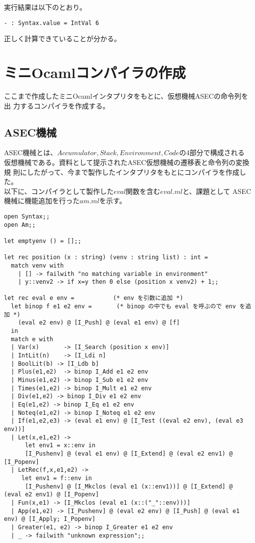 \documentclass[a4paper,9pt]{jsarticle}
\begin{document}
実行結果は以下のとおり。

\begin{lstlisting}
- : Syntax.value = IntVal 6
\end{lstlisting}

正しく計算できていることが分かる。

\section{ミニOcamlコンパイラの作成}
ここまで作成したミニOcamlインタプリタをもとに、仮想機械ASECの命令列を出
力するコンパイラを作成する。

\subsection{ASEC機械}
ASEC機械とは、$Accumulator, Stack, Environment, Code$の4部分で構成される
仮想機械である。資料として提示されたASEC仮想機械の遷移表と命令列の変換規
則にしたがって、今まで製作したインタプリタをもとにコンパイラを作成した。
\\

以下に、コンパイラとして製作した$eval$関数を含む$eval.ml$と、課題として
ASEC機械に機能追加を行った$am.ml$を示す。

\begin{lstlisting}[caption=eval.ml]
open Syntax;;
open Am;;

let emptyenv () = [];;

let rec position (x : string) (venv : string list) : int =
  match venv with
    | [] -> failwith "no matching variable in environment"
    | y::venv2 -> if x=y then 0 else (position x venv2) + 1;;

let rec eval e env =           (* env を引数に追加 *)
  let binop f e1 e2 env =       (* binop の中でも eval を呼ぶので env を追加 *)
    (eval e2 env) @ [I_Push] @ (eval e1 env) @ [f]
  in
  match e with
  | Var(x)       -> [I_Search (position x env)]
  | IntLit(n)    -> [I_Ldi n]
  | BoolLit(b) -> [I_Ldb b]
  | Plus(e1,e2)  -> binop I_Add e1 e2 env
  | Minus(e1,e2) -> binop I_Sub e1 e2 env
  | Times(e1,e2) -> binop I_Mult e1 e2 env
  | Div(e1,e2) -> binop I_Div e1 e2 env
  | Eq(e1,e2) -> binop I_Eq e1 e2 env
  | Noteq(e1,e2) -> binop I_Noteq e1 e2 env
  | If(e1,e2,e3) -> (eval e1 env) @ [I_Test ((eval e2 env), (eval e3 env))]
  | Let(x,e1,e2) -> 
      let env1 = x::env in
      [I_Pushenv] @ (eval e1 env) @ [I_Extend] @ (eval e2 env1) @ [I_Popenv]      
  | LetRec(f,x,e1,e2) -> 
     let env1 = f::env in
      [I_Pushenv] @ [I_Mkclos (eval e1 (x::env1))] @ [I_Extend] @ (eval e2 env1) @ [I_Popenv]
  | Fun(x,e1) -> [I_Mkclos (eval e1 (x::("_"::env)))]
  | App(e1,e2) -> [I_Pushenv] @ (eval e2 env) @ [I_Push] @ (eval e1 env) @ [I_Apply; I_Popenv] 
  | Greater(e1, e2) -> binop I_Greater e1 e2 env
  | _ -> failwith "unknown expression";;
\end{lstlisting}
\end{document}
